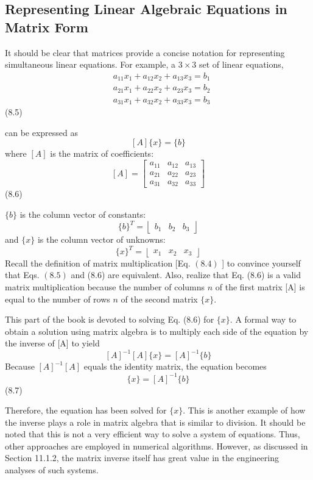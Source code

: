 \documentclass[../main.tex]{subfiles}
\begin{document}
\subsection{Representing Linear Algebraic Equations in Matrix Form}

\noindent It should be clear that matrices provide a concise notation for representing simultaneous linear equations. For example, a $3 \times 3$ set of linear equations,
$$
\begin{aligned}
&a_{11} x_{1}+a_{12} x_{2}+a_{13} x_{3}=b_{1} \\
&a_{21} x_{1}+a_{22} x_{2}+a_{23} x_{3}=b_{2} \\
&a_{31} x_{1}+a_{32} x_{2}+a_{33} x_{3}=b_{3}
\end{aligned}
$$\hfill{(8.5)}

can be expressed as
$$
[A]\{x\}=\{b\}
$$
where $[A]$ is the matrix of coefficients:
$$
[A]=\left[\begin{array}{lll}
a_{11} & a_{12} & a_{13} \\
a_{21} & a_{22} & a_{23} \\
a_{31} & a_{32} & a_{33}
\end{array}\right]
$$\hfill{(8.6)}


\noindent $\{b\}$ is the column vector of constants:
$$
\{b\}^{T}=\left\lfloor\begin{array}{lll}
b_{1} & b_{2} & b_{3}
\end{array}\right\rfloor
$$
and $\{x\}$ is the column vector of unknowns:
$$
\{x\}^{T}=\left\lfloor\begin{array}{lll}
x_{1} & x_{2} & x_{3}
\end{array}\right\rfloor
$$
Recall the definition of matrix multiplication [Eq. $(8.4)$ ] to convince yourself that Eqs. $(8.5)$ and (8.6) are equivalent. Also, realize that Eq. (8.6) is a valid matrix multiplication because the number of columns $n$ of the first matrix [A] is equal to the number of rows $n$ of the second matrix $\{x\}$.

This part of the book is devoted to solving Eq. (8.6) for $\{x\}$. A formal way to obtain a solution using matrix algebra is to multiply each side of the equation by the inverse of [A] to yield
$$
[A]^{-1}[A]\{x\}=[A]^{-1}\{b\}
$$
Because $[A]^{-1}[A]$ equals the identity matrix, the equation becomes
$$
\{x\}=[A]^{-1}\{b\}
$$\hfill{(8.7)}

Therefore, the equation has been solved for $\{x\}$. This is another example of how the inverse plays a role in matrix algebra that is similar to division. It should be noted that this is not a very efficient way to solve a system of equations. Thus, other approaches are employed in numerical algorithms. However, as discussed in Section 11.1.2, the matrix inverse itself has great value in the engineering analyses of such systems.
\end{document}
